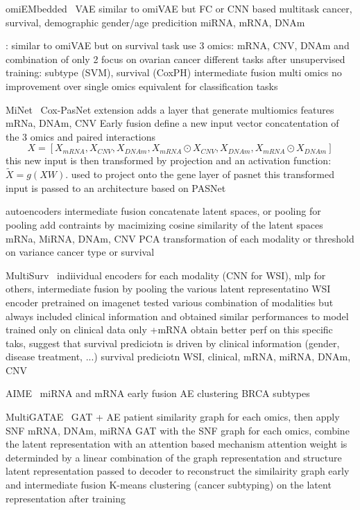 \documentclass[../main.tex]{subfiles}
\begin{document}
	omiEMbedded~\cite{Zhang2021} VAE similar to omiVAE but FC or CNN based 
	multitask cancer, survival, demographic gender/age predicition
	miRNA, mRNA, DNAm

	\cite{Hira2021}: similar to omiVAE but on survival task
	use 3 omics: mRNA, CNV, DNAm and combination of only 2
	focus on ovarian cancer 
	different tasks after unsupervised training: subtype (SVM), survival (CoxPH)
	intermediate fusion 
	multi omics no improvement over single omics equivalent for classification tasks 

	MiNet~\cite{Hao2019} Cox-PasNet extension 
	adds a layer that generate multiomics features 
	mRNa, DNAm, CNV
	Early fusion define a new input vector concatentation of the 3 omics and paired interactions 
	\begin{equation}
		X = \left[X_{mRNA}, X_{CNV}, X_{DNAm}, X_{mRNA}\odot X_{CNV}, X_{DNAm}, X_{mRNA}\odot X_{DNAm} \right]
	\end{equation}
	this new input is then transformed by projection and an activation function: \(\tilde{X} = g\left(XW\right)\).
	used to project onto the gene layer of pasnet
	this transformed input is passed to an architecture based on PASNet

	\cite{Tong2021} autoencoders intermediate fusion 
	concatenate latent spaces, or pooling 
	for pooling add contraints by macimizing cosine similarity of the latent spaces  
	mRNa, MiRNA, DNAm, CNV 
	PCA transformation of each modality or threshold on variance 
	cancer type or survival

	MultiSurv~\cite{MultiSurv} indiividual encoders for each modality (CNN for WSI), mlp for others, 
	intermediate fusion by pooling the various latent representatino 
	WSI encoder pretrained on imagenet 
	tested various combination of modalities but always  included clinical information and obtained similar performances to model trained only on clinical data only +mRNA obtain better perf on this specific taks, suggest that survival prediciotn is driven by clinical information (gender, disease treatment, ...)
	survival prediciotn 
	WSI, clinical, mRNA, miRNA, DNAm, CNV

	AIME~\cite{Yu2022} miRNA and mRNA early fusion AE
	clustering BRCA subtypes 
	
	MultiGATAE~\cite{MultiGATAE} GAT + AE
	patient similarity graph for each omics, then apply SNF 
	mRNA, DNAm, miRNA 
	GAT with the SNF graph for each omics, combine the latent representation with an attention based mechanism
	attention weight is determinded by a linear combination of the graph representation and structure
	latent representation passed to decoder to reconstruct the similairity graph 
	early and intermediate fusion 
	K-means clustering (cancer subtyping) on the latent representation after training
\end{document}
